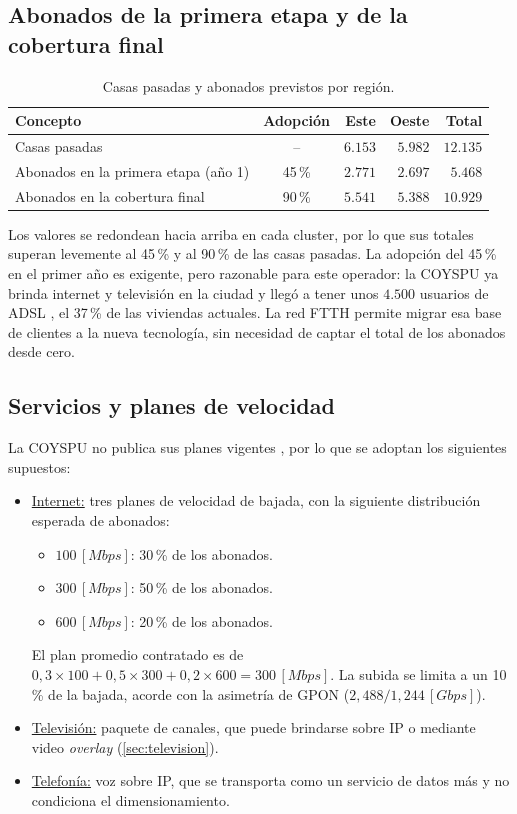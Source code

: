 \subsection{Abonados de la primera etapa y de la cobertura final}
\label{sec:abonados}
\begin{table}[H]
    \centering
    \caption{Casas pasadas y abonados previstos por región.}
    \label{tab:abonados}
    \begin{tabular}{|l|c|r|r|r|}
        \hline
        \textbf{Concepto} & \textbf{Adopción} & \textbf{Este} & \textbf{Oeste} & \textbf{Total} \\
        \hline
        Casas pasadas & -- & $6.153$ & $5.982$ & $12.135$ \\
        Abonados en la primera etapa (año 1) & 45\,\% & $2.771$ & $2.697$ & $5.468$ \\
        Abonados en la cobertura final & 90\,\% & $5.541$ & $5.388$ & $10.929$ \\
        \hline
    \end{tabular}
\end{table}

Los valores se redondean hacia arriba en cada cluster, por lo que sus totales superan levemente al 45\,\% y al 90\,\% de las casas pasadas. La adopción del 45\,\% en el primer año es exigente, pero razonable para este operador: la COYSPU ya brinda internet y televisión en la ciudad y llegó a tener unos $4.500$ usuarios de ADSL \cite{coyspu}, el 37\,\% de las viviendas actuales. La red FTTH permite migrar esa base de clientes a la nueva tecnología, sin necesidad de captar el total de los abonados desde cero.

\subsection{Servicios y planes de velocidad}
\label{sec:servicios}
La COYSPU no publica sus planes vigentes \cite{coyspu}, por lo que se adoptan los siguientes supuestos:
\begin{itemize}
    \item \underline{Internet:} tres planes de velocidad de bajada, con la siguiente distribución esperada de abonados:
    \begin{itemize}
        \item $100 \, [Mbps]$: 30\,\% de los abonados.
        \item $300 \, [Mbps]$: 50\,\% de los abonados.
        \item $600 \, [Mbps]$: 20\,\% de los abonados.
    \end{itemize}
    El plan promedio contratado es de $0{,}3 \times 100 + 0{,}5 \times 300 + 0{,}2 \times 600 = 300 \, [Mbps]$. La subida se limita a un 10\,\% de la bajada, acorde con la asimetría de GPON ($2{,}488 / 1{,}244 \, [Gbps]$).
    \item \underline{Televisión:} paquete de canales, que puede brindarse sobre IP o mediante video \textit{overlay} (\autoref{sec:television}).
    \item \underline{Telefonía:} voz sobre IP, que se transporta como un servicio de datos más y no condiciona el dimensionamiento.
\end{itemize}

